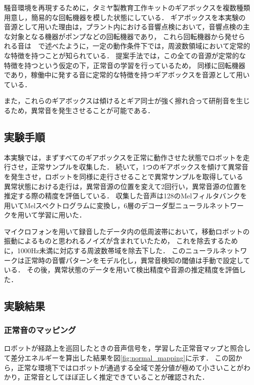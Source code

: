 \documentclass[../main]{subfiles}
\begin{document}
騒音環境を再現するために，タミヤ製教育工作キットのギアボックスを複数種類用意し，簡易的な回転機器を模した状態にしている．
ギアボックスを本実験の音源として用いた理由は，プラント内における音響点検において，音響点検の主な対象となる機器がポンプなどの回転機器であり，
これら回転機器から発せられる音は　で述べたように，一定の動作条件下では，周波数領域において定常的な特徴を持つことが知られている．
提案手法では，この全ての音源が定常的な特徴を持つという仮定の下，正常音の学習を行っているため，
同様に回転機器であり，稼働中に発する音に定常的な特徴を持つギアボックスを音源として用いている．

また，これらのギアボックスは傾けるとギア同士が強く擦れ合って研削音を生じるため，異常音を発生させることが可能である．
\subsection{実験手順} \label{subsec:experiment_procedure}

本実験では，まずすべてのギアボックスを正常に動作させた状態でロボットを走行させ，正常サンプルを収集した．
続いて，1つのギアボックスを傾けて異常音を発生させ，ロボットを同様に走行させることで異常サンプルを取得している
異常状態における走行は，異常音源の位置を変えて2回行い，異常音源の位置を推定する際の精度を評価している．
収集した音声は128のMelフィルタバンクを用いてMelスペクトログラムに変換し，6層のデコーダ型ニューラルネットワークを用いて学習に用いた．

マイクロフォンを用いて録音したデータ内の低周波帯において，移動ロボットの振動によるものと思われるノイズが含まれていたため，
これを除去するために，1000Hz未満に対応する周波数帯域を除去下した．
このニューラルネットワークは正常時の音響パターンをモデル化し，異常音検知の閾値は手動で設定している．
その後，異常状態のデータを用いて検出精度や音源の推定精度を評価した．

\subsection{実験結果} \label{subsec:vexp_ref_result}

\subsubsection{正常音のマッピング} \label{subsubsec:normal_mapping}

ロボットが経路上を巡回したときの音声信号を，学習した正常音マップと照合して差分エネルギーを算出した結果を図\ref{fig:normal_mapping}に示す．
この図から，正常な環境下ではロボットが通過する全域で差分値が極めて小さいことがわかり，正常音としてほぼ正しく推定できていることが確認された．
\end{document}

